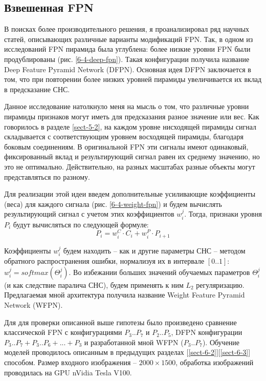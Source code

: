 \subsection{Взвешенная FPN} \label{sect-wfpn}

В поисках более производительного решения, я проанализировал ряд научных статей, описывающих различные варианты модификаций FPN. Так, в одном из исследований \cite{lib-dfpn} FPN пирамида была углублена: более низкие уровни FPN были продублированы (рис. \ref{6-4-deep-fpn}). Такая конфигурации получила название Deep Feature Pyramid Network (DFPN). Основная идея DFPN заключается в том, что при повторении более низких уровней пирамиды увеличивается их вклад в предсказание СНС.


Данное исследование натолкнуло меня на мысль о том, что различные уровни пирамиды признаков могут иметь для предсказания разное значение или вес. Как говорилось в разделе \ref{sect-5-2}, на каждом уровне нисходящей пирамиды сигнал складывается с соответствующим уровнем восходящей пирамиды, благодаря боковым соединениям. В оригинальной FPN эти сигналы имеют одинаковый, фиксированный вклад и результирующий сигнал равен их среднему значению, но это не оптимально. Действительно, на разных масштабах разные объекты могут представляться по разному. 

Для реализации этой идеи введем дополнительные усиливающие коэффициенты (веса) для каждого сигнала (рис. \ref{6-4-weight-fpn}) и будем вычислять результирующий сигнал с учетом этих коэффициентов $w^{j}_{i}$. Тогда, признаки уровня $P_i$ будут вычисляться по следующей формуле:
$$
P_i = w^{C}_i \cdot C_i + w^{P}_i \cdot P_{i+1}
$$

Коэффициенты $w^{j}_{i}$ будем находить -- как и другие параметры СНС -- методом обратного распространения ошибки, нормализуя их в интервале $[0..1]$: $w^{j}_{i} = softmax(\Theta^{j}_{i})$. Во избежании больших значений обучаемых параметров $\Theta^{j}_{i}$ (и как следствие паралича СНС), будем применять к ним $L_2$ регуляризацию. Предлагаемая мной архитектура получила название Weight Feature Pyramid Network (WFPN).


Для для проверки описанной выше гипотезы было произведено сравнение классической FPN с конфигурациями $P_3..P_7$ и $P_2..P_5$, DFPN конфигурации $P_3..P_7 + P_3..P_6 + ... + P_3$ и разработанной мной WFPN ($P_3..P_7$). Обучение моделей проводилось описанным в предыдущих разделах [\ref{sect-6-2}][\ref{sect-6-3}] способом. Размер входного изображения -- $2000\times1500$, обработка изображений проводилась на GPU nVidia Tesla V100.

